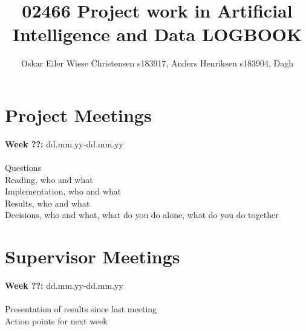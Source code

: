 \documentclass[11pt, fleqn]{article}
\title{02466 Project work in Artificial Intelligence and Data LOGBOOK}
\author{Oskar Eiler Wiese Christensen s183917, Anders Henriksen s183904, Dagh}
\begin{document}
	\maketitle
		
\section*{Project Meetings}
	
	\textbf{Week ??:}  dd.mm.yy-dd.mm.yy \\\\
	\noindent
	Questions \\
	Reading, who and what \\
	Implementation, who and what \\
	Results, who and what \\
	Decisions, who and what, what do you do alone, what do you do together
	
\section*{Supervisor Meetings}
	
	\textbf{Week ??:}  dd.mm.yy-dd.mm.yy \\\\
	\noindent
	Presentation of results since last meeting \\
	Action points for next week
	
\end{document}
